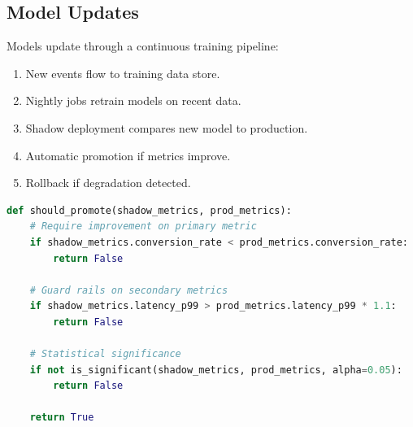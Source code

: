 \subsection{Model Updates}

Models update through a continuous training pipeline:

\begin{enumerate}
\item New events flow to training data store.
\item Nightly jobs retrain models on recent data.
\item Shadow deployment compares new model to production.
\item Automatic promotion if metrics improve.
\item Rollback if degradation detected.
\end{enumerate}

\begin{lstlisting}[language=Python,caption=Model promotion logic]
def should_promote(shadow_metrics, prod_metrics):
    # Require improvement on primary metric
    if shadow_metrics.conversion_rate < prod_metrics.conversion_rate:
        return False

    # Guard rails on secondary metrics
    if shadow_metrics.latency_p99 > prod_metrics.latency_p99 * 1.1:
        return False

    # Statistical significance
    if not is_significant(shadow_metrics, prod_metrics, alpha=0.05):
        return False

    return True
\end{lstlisting}

